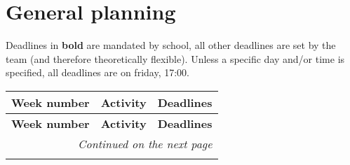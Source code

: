 \documentclass{article} %
\begin{document}
\section{General planning} %
Deadlines in \textbf{bold} are mandated by school, all other deadlines are set by the team (and therefore theoretically flexible).
Unless a specific day and/or time is specified, all deadlines are on friday, 17:00.
\begin{longtable}{|l|p{}|p{}|}
    \hline
    \textbf{Week number} & \textbf{Activity}                         & \textbf{Deadlines}                      \\ \hline
    \endfirsthead

    \hline
    \textbf{Week number} & \textbf{Activity}                         & \textbf{Deadlines}                      \\ \hline
    \endhead

    \hline \multicolumn{3}{r}{\textit{Continued on the next page}}                                             \\ \hline
    \endfoot

    \hline
    \endlastfoot


\end{longtable}
\end{document}
